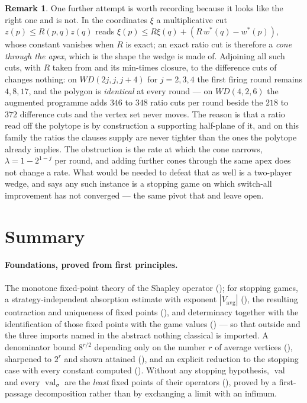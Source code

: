 \documentclass[11pt]{article}
\theoremstyle{plain}
\theoremstyle{definition}
\newtheorem{remark}[theorem]{Remark}
\DeclareMathOperator{\val}{val}
\newcommand{\Vavg}{V_{\mathrm{avg}}}
\begin{document}
\begin{remark}
One further attempt is worth recording because it looks like the right
one and is not. In the coordinates $\xi$ a multiplicative cut
$z(p)\le R(p,q)z(q)$ reads
$\xi(p)\le R\xi(q)+(R\,w^\ast(q)-w^\ast(p))$, whose constant vanishes
when $R$ is exact; an exact ratio cut is therefore a \emph{cone through
the apex}, which is the shape the wedge is made of. Adjoining all such
cuts, with $R$ taken from  and its min-times closure, to
the difference cuts of  changes nothing: on
$WD(2j,j,j+4)$ for $j=2,3,4$ the first firing round remains $4,8,17$,
and the polygon is \emph{identical} at every round --- on $WD(4,2,6)$
the augmented programme adds $346$ to $348$ ratio cuts per round beside
the $218$ to $372$ difference cuts and the vertex set never moves. The
reason is that a ratio read off the polytope is by construction a
supporting half-plane of it, and on this family the ratios the clauses
supply are never tighter than the ones the polytope already implies. The
obstruction is the rate at which the cone narrows, $\lambda=1-2^{1-j}$
per round, and adding further cones through the same apex does not
change a rate. What would be needed to defeat that as well is a two-player
wedge, and  says any such instance is a stopping game
on which switch-all improvement has not converged --- the same pivot that
 and  leave open.
\end{remark}


\section{Summary}\label{sec:summary}

\paragraph{Foundations, proved from first principles.} The monotone
fixed-point theory of the Shapley operator (); for
stopping games, a strategy-independent absorption estimate with exponent
$|\Vavg|$ (), the resulting contraction and
uniqueness of fixed points (), and determinacy
together with the identification of those fixed points with the game
values () --- so that outside
 and the three imports named in the abstract
nothing classical is imported. A denominator bound
$8^{r/2}$ depending only on the number $r$ of average vertices
(), sharpened to $2^{r}$ and shown attained
(), and an explicit reduction to the stopping
case with every constant computed ().
Without any stopping hypothesis, $\val$ and every $\val_\sigma$ are the
\emph{least} fixed points of their operators (),
proved by a first-passage decomposition rather than by exchanging a limit
with an infimum.
\end{document}
